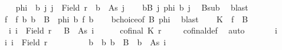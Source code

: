 \begin{isabellebody}
%
\isadelimproof
%
\endisadelimproof
%
\isatagproof
{}\isamarkupfalse%
{\isacharminus}{\kern0pt}\isanewline
\ \ \isamarkupfalse%
\ {\isacharquery}{\kern0pt}phi\ {\isacharequal}{\kern0pt}\ {\isachardoublequoteopen}{\isasymlambda}b\ j{\isachardot}{\kern0pt}\ j\ {\isasymin}\ Field\ r\ {\isasymand}\ b\ {\isasymin}\ As\ j{\isachardoublequoteclose}\isanewline
\ \ \isamarkupfalse%
\ {\isachardoublequoteopen}{\isasymforall}b{\isasymin}B{\isachardot}{\kern0pt}\ {\isasymexists}j{\isachardot}{\kern0pt}\ {\isacharquery}{\kern0pt}phi\ b\ j{\isachardoublequoteclose}\ \isamarkupfalse%
\ Bsub\ \isamarkupfalse%
\ blast\isanewline
\ \ \isamarkupfalse%
\ \isamarkupfalse%
\ f\ \ f{\isacharcolon}{\kern0pt}\ {\isachardoublequoteopen}{\isasymAnd}b{\isachardot}{\kern0pt}\ b\ {\isasymin}\ B\ {\isasymLongrightarrow}\ {\isacharquery}{\kern0pt}phi\ b\ {\isacharparenleft}{\kern0pt}f\ b{\isacharparenright}{\kern0pt}{\isachardoublequoteclose}\isanewline
\ \ \isamarkupfalse%
\ bchoice{\isacharbrackleft}{\kern0pt}of\ B\ {\isacharquery}{\kern0pt}phi{\isacharbrackright}{\kern0pt}\ \isamarkupfalse%
\ blast\isanewline
\ \ \isamarkupfalse%
\ {\isacharquery}{\kern0pt}K\ {\isacharequal}{\kern0pt}\ {\isachardoublequoteopen}f\ {\isacharbackquote}{\kern0pt}\ B{\isachardoublequoteclose}\isanewline
\ \ \isacommand{{\isacharbraceleft}{\kern0pt}}\isamarkupfalse%
\isamarkupfalse%
\ {}{\isacharcolon}{\kern0pt}\ {\isachardoublequoteopen}{\isasymAnd}i{\isachardot}{\kern0pt}\ i\ {\isasymin}\ Field\ r\ {\isasymLongrightarrow}\ {\isasymnot}\ B\ {\isasymle}\ As\ i{\isachardoublequoteclose}\isanewline
\ \ \ \isamarkupfalse%
\ {}{\isacharcolon}{\kern0pt}\ {\isachardoublequoteopen}cofinal\ {\isacharquery}{\kern0pt}K\ r{\isachardoublequoteclose}\isanewline
\ \ \ \isamarkupfalse%
\ cofinal{\isacharunderscore}{\kern0pt}def\ \isamarkupfalse%
\ auto\isanewline
\ \ \ \ \ \isamarkupfalse%
\ i\ \isamarkupfalse%
\ i{\isacharcolon}{\kern0pt}\ {\isachardoublequoteopen}i\ {\isasymin}\ Field\ r{\isachardoublequoteclose}\isanewline
\ \ \ \ \ \isamarkupfalse%
\ {}\ \isamarkupfalse%
\ b\ \ b{\isacharcolon}{\kern0pt}\ {\isachardoublequoteopen}b\ {\isasymin}\ B\ {\isasymand}\ b\ {\isasymnotin}\ As\ i{\isachardoublequoteclose}\ \isamarkupfalse%

\end{isabellebody}
